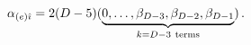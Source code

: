 \begin{equation}
\label{Mel}
 \alpha_{(e)\hat\imath}=2(D-5) (\underbrace { 0, \dots ,\beta_{D-3},
\beta_{D-2},\beta_{D-1} }_{k=D-3 \rm~ terms})\, .
\end{equation} 
